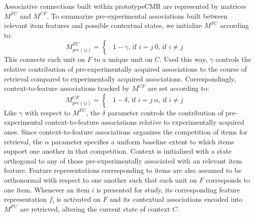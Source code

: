 {}\markdownRendererInterblockSeparator
{}Associative connections built within prototypeCMR are represented by matrices $M^{FC}$ and $M^{CF}$.\markdownRendererInterblockSeparator
{}To summarize pre-experimental associations built between relevant item features and possible contextual states, we initialize $M^{FC}$ according to:\markdownRendererInterblockSeparator
{}$$M^{FC}_{pre(ij)} = \begin{cases} \begin{alignedat}{2} 1 - \gamma \text{, if } i=j \ 0 \text{, if } i \neq j\ \end{alignedat} \end{cases}$$\markdownRendererInterblockSeparator
{}This connects each unit on $F$ to a unique unit on $C$. Used this way, $\gamma$ controls the relative contribution of pre-experimentally acquired associations to the course of retrieval compared to experimentally acquired associations. Correspondingly, context-to-feature associations tracked by $M^{CF}$ are set according to:\markdownRendererInterblockSeparator
{}$$M^{CF}_{pre(ij)} = \begin{cases} \begin{alignedat}{2} 1 - \delta \text{, if } i=j \ \alpha \text{, if } i \neq j\ \end{alignedat} \end{cases}$$\markdownRendererInterblockSeparator
{}Like $\gamma$ with respect to $M^{FC}$, the $\delta$ parameter controls the contribution of pre-experimental context-to-feature associations relative to experimentally acquired ones. Since context-to-feature associations organizes the competition of items for retrieval, the $\alpha$ parameter specifies a uniform baseline extent to which items support one another in that competition.\markdownRendererInterblockSeparator
{}Context is initialized with a state orthogonal to any of those pre-experimentally associated with an relevant item feature. Feature representations corresponding to items are also assumed to be orthonormal with respect to one another such that each unit on $F$ corresponds to one item.\markdownRendererInterblockSeparator
{}\markdownRendererInterblockSeparator
{}Whenever an item $i$ is presented for study, its corresponding feature representation $f_i$ is activated on $F$ and its contextual associations encoded into $M^{FC}$ are retrieved, altering the current state of context $C$.\relax